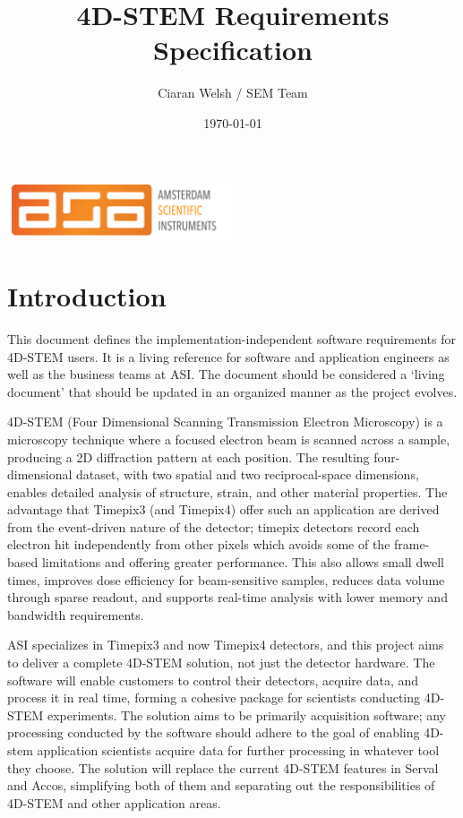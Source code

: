 \documentclass[12pt]{article}
\title{4D-STEM Requirements Specification}
\author{Ciaran Welsh / SEM Team}
\date{\today}
\begin{document}
\maketitle

\begin{center}
  \includegraphics[width=0.5\textwidth]{asi-logo}
\end{center}

\tableofcontents
\newpage


\section{Introduction}\label{sec:intro}
This document defines the implementation-independent software requirements for 4D-STEM users. It is a living reference for software and application engineers as well as the business teams at ASI. The document should be considered a `living document' that should be updated in an organized manner as the project evolves.

4D-STEM (Four Dimensional Scanning Transmission Electron Microscopy) is a microscopy technique where a focused electron beam is scanned across a sample, producing a 2D diffraction pattern at each position. The resulting four-dimensional dataset, with two spatial and two reciprocal-space dimensions, enables detailed analysis of structure, strain, and other material properties. The advantage that Timepix3 (and Timepix4) offer such an application are derived from the event-driven nature of the detector; timepix detectors record each electron hit independently from other pixels which avoids some of the frame-based limitations and offering greater performance. This also allows small dwell times, improves dose efficiency for beam-sensitive samples, reduces data volume through sparse readout, and supports real-time analysis with lower memory and bandwidth requirements.

ASI specializes in Timepix3 and now Timepix4 detectors, and this project aims to deliver a complete 4D-STEM solution, not just the detector hardware. The software will enable customers to control their detectors, acquire data, and process it in real time, forming a cohesive package for scientists conducting 4D-STEM experiments. The solution aims to be primarily acquisition software; any processing conducted by the software should adhere to the goal of enabling 4D-stem application scientists acquire data for further processing in whatever tool they choose. The solution will replace the current 4D-STEM features in Serval and Accos, simplifying both of them and separating out the responsibilities of 4D-STEM and other application areas.
\end{document}
